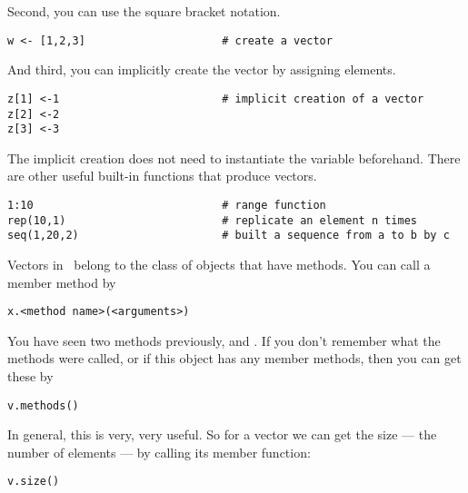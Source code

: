 Second, you can use the square bracket notation.
{\tt \begin{snugshade*}
\begin{lstlisting}    
w <- [1,2,3]                     # create a vector
\end{lstlisting}
\end{snugshade*}}
And third, you can implicitly create the vector by assigning elements.
{\tt \begin{snugshade*}
\begin{lstlisting}    
z[1] <-1                         # implicit creation of a vector
z[2] <-2                   
z[3] <-3                  
\end{lstlisting}
\end{snugshade*}} 
The implicit creation does not need to instantiate the variable beforehand.
There are other useful built-in functions that produce vectors.
{\tt \begin{snugshade*}
\begin{lstlisting}    
1:10                             # range function
rep(10,1)                        # replicate an element n times
seq(1,20,2)                      # built a sequence from a to b by c
\end{lstlisting}
\end{snugshade*}} 

Vectors in \Rev~belong to the class of objects that have methods.
You  can call a member method by
{\tt \begin{snugshade*}
\begin{lstlisting}    
x.<method name>(<arguments>)                 
\end{lstlisting}
\end{snugshade*}} 
You have seen two methods previously,  and .
If you don't remember what the methods were called, or if this object has any member methods, then you can get these by
{\tt \begin{snugshade*}
\begin{lstlisting}    
v.methods()                 
\end{lstlisting}
\end{snugshade*}} 
In general, this is very, very useful.
So for a vector we can get the size --- the number of elements --- by calling its member function:
{\tt \begin{snugshade*}
\begin{lstlisting}    
v.size()                 
\end{lstlisting}
\end{snugshade*}} 


